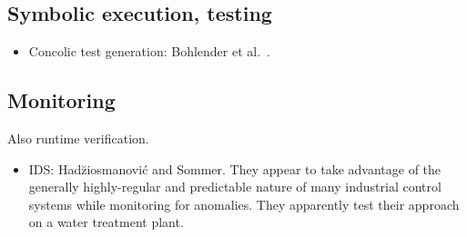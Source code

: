 \subsection{Symbolic execution, testing}

\begin{itemize}

\item Concolic test generation: Bohlender et al.~\cite{bohlender:concolic}.

\end{itemize}

\subsection{Monitoring}

Also runtime verification.

\begin{itemize}

\item IDS: Had\u ziosmanovi\'c and Sommer. They appear to take advantage of the
generally highly-regular and predictable nature of many industrial control
systems while monitoring for anomalies. They apparently test their approach on a
water treatment plant.


\end{itemize}

